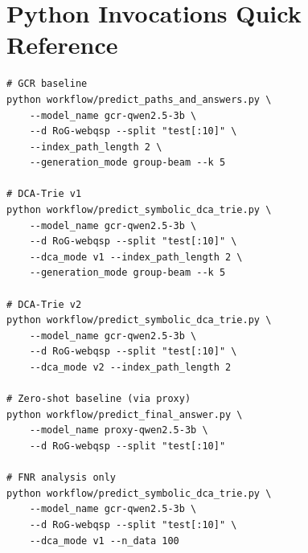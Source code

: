 \documentclass[11pt,a4paper,oneside,openany]{book}
\theoremstyle{definition}
\begin{document}
\section{Python Invocations Quick Reference}

\begin{lstlisting}[numbers=none,frame=none]
# GCR baseline
python workflow/predict_paths_and_answers.py \
    --model_name gcr-qwen2.5-3b \
    --d RoG-webqsp --split "test[:10]" \
    --index_path_length 2 \
    --generation_mode group-beam --k 5

# DCA-Trie v1
python workflow/predict_symbolic_dca_trie.py \
    --model_name gcr-qwen2.5-3b \
    --d RoG-webqsp --split "test[:10]" \
    --dca_mode v1 --index_path_length 2 \
    --generation_mode group-beam --k 5

# DCA-Trie v2
python workflow/predict_symbolic_dca_trie.py \
    --model_name gcr-qwen2.5-3b \
    --d RoG-webqsp --split "test[:10]" \
    --dca_mode v2 --index_path_length 2

# Zero-shot baseline (via proxy)
python workflow/predict_final_answer.py \
    --model_name proxy-qwen2.5-3b \
    --d RoG-webqsp --split "test[:10]"

# FNR analysis only
python workflow/predict_symbolic_dca_trie.py \
    --model_name gcr-qwen2.5-3b \
    --d RoG-webqsp --split "test[:10]" \
    --dca_mode v1 --n_data 100
\end{lstlisting}
\end{document}
